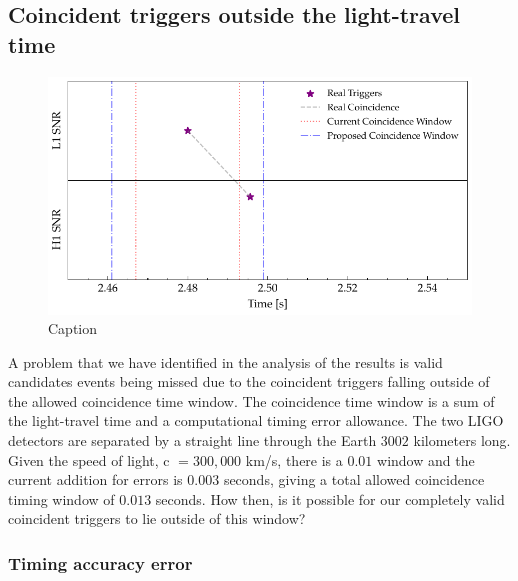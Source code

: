 



\subsection{\label{6:sec:outside-coinc-window}Coincident triggers outside the light-travel time}
%
\begin{figure}
    \centering
    \includegraphics[width=\textwidth]{images/6_earlywarning/identified-problems/outside_coinc_window.pdf}
    \caption{Caption}
    \label{6:fig:outside_coinc_window}
\end{figure}
%

A problem that we have identified in the analysis of the results is valid candidates events being missed due to the coincident triggers falling outside of the allowed coincidence time window. The coincidence time window is a sum of the light-travel time and a computational timing error allowance. The two LIGO detectors are separated by a straight line through the Earth $3002$ kilometers long. Given the speed of light, c $= 300,000$ km/s, there is a $0.01$ window and the current addition for errors is $0.003$ seconds, giving a total allowed coincidence timing window of $0.013$ seconds. How then, is it possible for our completely valid coincident triggers to lie outside of this window?

\subsubsection{\label{}Timing accuracy error}

